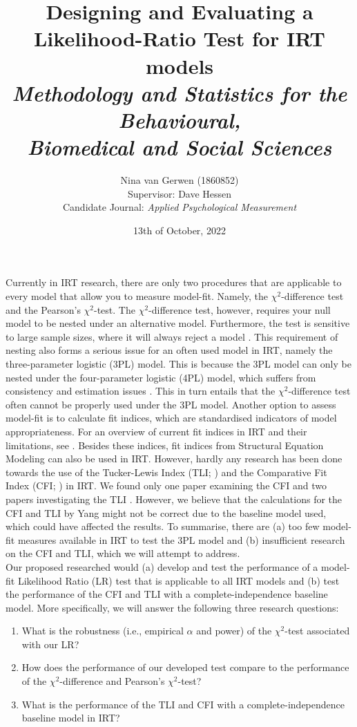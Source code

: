 \documentclass{article}
\title{%
	Designing and Evaluating a Likelihood-Ratio Test for IRT models \\
	\large \textit{Methodology and Statistics for the Behavioural, \\
	Biomedical and Social Sciences}}
\author{Nina van Gerwen (1860852) \\ 
	Supervisor: Dave Hessen \\ 
	\small {Candidate Journal: \textit{Applied Psychological Measurement}}}
\date{13th of October, 2022}
\begin{document}
\maketitle

\newpage

\section{}
\indent Currently in IRT research, there are only two procedures that are applicable to every model that allow you to measure model-fit. Namely, the $\chi^2$-difference test and the Pearson's $\chi^2$-test. The $\chi^2$-difference test, however, requires your null model to be nested under an alternative model. Furthermore, the test is sensitive to large sample sizes, where it will always reject a model \autocite{chi2sens}. This requirement of nesting also forms a serious issue for an often used model in IRT, namely the three-parameter logistic (3PL) model. This is because the 3PL model can only be nested under the four-parameter logistic (4PL) model, which suffers from consistency and estimation issues \autocite{4plconsist1, 4plconsist2}. This in turn entails that the $\chi^2$-difference test often cannot be properly used under the 3PL model. Another option to assess model-fit is to calculate fit indices, which are standardised indicators of model appropriateness. For an overview of current fit indices in IRT and their limitations, see \textcite{ref1}. Besides these indices, fit indices from Structural Equation Modeling can also be used in IRT. However, hardly any research has been done towards the use of the Tucker-Lewis Index (TLI; \cite{tli}) and the Comparative Fit Index (CFI; \cite{cfi}) in IRT. We found only one paper examining the CFI \autocite{yangfitindex} and two papers investigating the TLI \autocite{yangfitindex, tliirt}. However, we believe that the calculations for the CFI and TLI by Yang might not be correct due to the baseline model used, which could have affected the results. To summarise, there are (a) too few model-fit measures available in IRT to test the 3PL model and (b) insufficient research on the CFI and TLI, which we will attempt to address. \\
\indent Our proposed researched would (a) develop and test the performance of a model-fit Likelihood Ratio (LR) test that is applicable to all IRT models and (b) test the performance of the CFI and TLI with a complete-independence baseline model. More specifically, we will answer the following three research questions:
\begin{enumerate}
\item What is the robustness (i.e., empirical $\alpha$ and power) of the $\chi^2$-test associated with our LR?
\item How does the performance of our developed test compare to the performance of the $\chi^2$-difference and Pearson's $\chi^2$-test?
\item What is the performance of the TLI and CFI with a complete-independence baseline model in IRT?
\end{enumerate}
\end{document}
